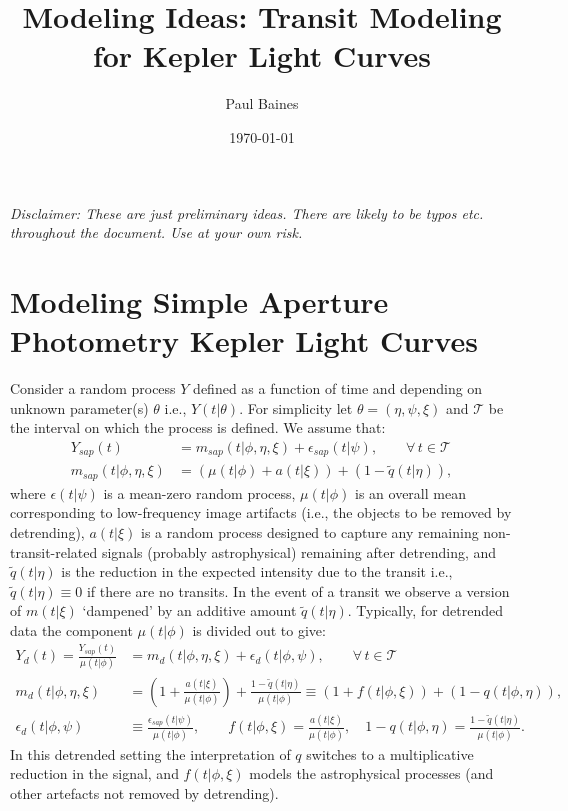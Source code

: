 \documentclass[a4paper,11pt]{article}
\begin{document}
\title{Modeling Ideas: Transit Modeling for Kepler Light Curves}
\author{Paul Baines}
\date{\today}
\maketitle

\emph{Disclaimer: These are just preliminary ideas. There are likely to be typos etc. throughout the document. Use at your own risk. \smiley}

\section{Modeling Simple Aperture Photometry Kepler Light Curves}

Consider a random process $Y$ defined as a function of time and depending on unknown parameter(s) $\theta$ i.e., $Y(t|\theta)$. For simplicity let $\theta=(\eta,\psi,\xi)$ and $\mathcal{T}$ be the interval on which the process is defined. We assume that:
\begin{align}
\label{eq:main_def}
 Y_{sap}(t) &= m_{sap}(t|\phi,\eta,\xi) + \epsilon_{sap}(t|\psi) , \qquad \forall \, t \in \mathcal{T} \\
 m_{sap}(t|\phi,\eta,\xi) &= (\mu(t|\phi)+a(t|\xi)) + (1 - \tilde{q}(t|\eta)) , 
\end{align}
where $\epsilon(t|\psi)$ is a mean-zero random process, $\mu(t|\phi)$ is an overall mean corresponding to low-frequency image artifacts (i.e., the objects to be removed by detrending), $a(t|\xi)$ is a random process designed to capture any remaining non-transit-related signals (probably astrophysical) remaining after detrending,  and $\tilde{q}(t|\eta)$ is the reduction in the expected intensity due to the transit i.e., $\tilde{q}(t|\eta)\equiv{}0$ if there are no transits. In the event of a transit we observe a version of $m(t|\xi)$ \lq{}dampened\rq{} by an additive amount $\tilde{q}(t|\eta)$. Typically, for detrended data the component $\mu(t|\phi)$ is divided out to give:
\begin{align}
\label{eq:detrended_model}
 Y_{d}(t) = \frac{Y_{sap}(t)}{\mu(t|\phi)} &= m_{d}(t|\phi,\eta,\xi) + \epsilon_{d}(t|\phi,\psi) , \qquad \forall \, t \in \mathcal{T} \\
 \nonumber
 m_{d}(t|\phi,\eta,\xi) &= \left(1+\frac{a(t|\xi)}{\mu(t|\phi)}\right) + \frac{1-\tilde{q}(t|\eta)}{\mu(t|\phi)} \equiv (1+f(t|\phi,\xi)) + (1-q(t|\phi,\eta)) , \\
\label{eq:redetrend}
 \epsilon_{d}(t|\phi,\psi) &\equiv \frac{\epsilon_{sap}(t|\psi)}{\mu(t|\phi)} , \qquad f(t|\phi,\xi) = \frac{a(t|\xi)}{\mu(t|\phi)} , \quad 1-q(t|\phi,\eta) = \frac{1-\tilde{q}(t|\eta)}{\mu(t|\phi)} .
\end{align}
In this detrended setting the interpretation of $q$ switches to a multiplicative reduction in the signal, and $f(t|\phi,\xi)$ models the astrophysical processes (and other artefacts not removed by detrending). 
\end{document}
